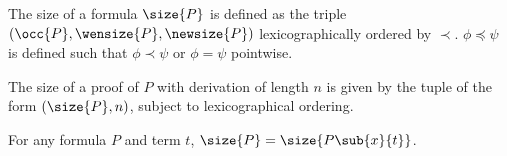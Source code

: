 \documentclass[UKenglish,acmsmall,authorversion]{acmart}
\theoremstyle{plain}
\begin{document}
{\begin{definition}
The size of a formula $\size{P}$ is defined as the triple $\left(\occ{P}, \wensize{P}, \newsize{P} \right)$ lexicographically ordered by $\prec$.
$\phi \preceq \psi$ is defined such that $\phi \prec \psi$ or $\phi = \psi$ pointwise.
\end{definition}


\begin{definition}\label{definition:size}
The size of a proof of $P$ with derivation of length $n$ is given by the tuple of the form $\left(\size{P}, n\right)$, subject to lexicographical ordering.
\end{definition}

%
%
\begin{lemma}\label{lemma:size-sub}
For any formula $P$ and term $t$, $\size{ P } = \size{ P\sub{x}{t} }$.
\end{lemma}

}
\end{document}
